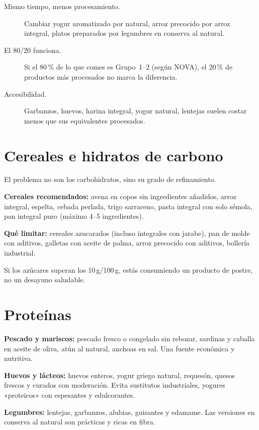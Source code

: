 \documentclass[a5paper,12pt,oneside,openany]{book}
\newcommand{\boxamarillo}[2]{%
  \begin{tcolorbox}[cajabase,
    colback=amarillo!12!white, colframe=amarillo!80!black, title={#1}]
  #2\end{tcolorbox}}
\begin{document}
\begin{description}
  \item[Mismo tiempo, menos procesamiento.] Cambiar yogur aromatizado por
    natural, arroz precocido por arroz integral, platos preparados por
    legumbres en conserva al natural.
  \item[El 80/20 funciona.] Si el 80\,\% de lo que comes es Grupo~1--2
    (según NOVA), el 20\,\% de productos más procesados no marca la diferencia.
  \item[Accesibilidad.] Garbanzos, huevos, harina integral, yogur natural,
    lentejas suelen costar menos que sus equivalentes procesados.
\end{description}

\section{Cereales e hidratos de carbono}

El problema no son los carbohidratos, sino su grado de refinamiento.

\textbf{Cereales recomendados:} avena en copos sin ingredientes añadidos,
arroz integral, espelta, cebada perlada, trigo sarraceno, pasta integral con
solo sémola, pan integral puro (máximo 4--5 ingredientes).

\textbf{Qué limitar:} cereales azucarados (incluso integrales con jarabe),
pan de molde con aditivos, galletas con aceite de palma, arroz precocido con
aditivos, bollería industrial.

\boxamarillo{Consejo para el desayuno}{Si los azúcares superan los 10\,g/100\,g,
estás consumiendo un producto de postre, no un desayuno saludable.}

\section{Proteínas}

\textbf{Pescado y mariscos:} pescado fresco o congelado sin rebozar, sardinas
y caballa en aceite de oliva, atún al natural, anchoas en sal. Una fuente
económica y nutritiva.

\textbf{Huevos y lácteos:} huevos enteros, yogur griego natural, requesón,
quesos frescos y curados con moderación. Evita sustitutos industriales,
yogures «proteicos» con espesantes y edulcorantes.

\textbf{Legumbres:} lentejas, garbanzos, alubias, guisantes y edamame.
Las versiones en conserva al natural son prácticas y ricas en fibra.
\end{document}
